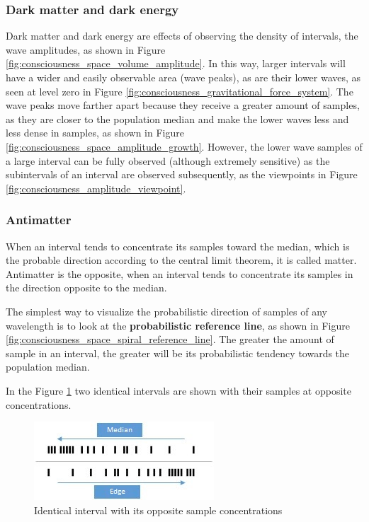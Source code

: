 \subsubsection{Dark matter and dark energy}
Dark matter and dark energy are effects of observing the density of intervals, the wave amplitudes, as shown in Figure \ref{fig:consciousness_space_volume_amplitude}. In this way, larger intervals will have a wider and easily observable area (wave peaks), as are their lower waves, as seen at level zero in Figure \ref{fig:consciousness_gravitational_force_system}. The wave peaks move farther apart because they receive a greater amount of samples, as they are closer to the population median and make the lower waves less and less dense in samples, as shown in Figure \ref{fig:consciousness_space_amplitude_growth}. However, the lower wave samples of a large interval can be fully observed (although extremely sensitive) as the subintervals of an interval are observed subsequently, as the viewpoints in Figure \ref{fig:consciousness_amplitude_viewpoint}.

\subsubsection{Antimatter}
When an interval tends to concentrate its samples toward the median, which is the probable direction according to the central limit theorem, it is called matter. Antimatter is the opposite, when an interval tends to concentrate its samples in the direction opposite to the median. 

The simplest way to visualize the probabilistic direction of samples of any wavelength is to look at the \textbf{probabilistic reference line}, as shown in Figure \ref{fig:consciousness_space_spiral_reference_line}. The greater the amount of sample in an interval, the greater will be its probabilistic tendency towards the population median.

In the Figure \ref{fig:consciousness_concentration_of_opposite_samples} two identical intervals are shown with their samples at opposite concentrations.
	\begin{figure}[H]
	\caption{Identical interval with its opposite sample concentrations}
	\label{fig:consciousness_concentration_of_opposite_samples}
	\centering
	\includegraphics[scale=1.2]{sections/images/consciousness_concentration_of_opposite_samples.jpg}
	\end{figure}

